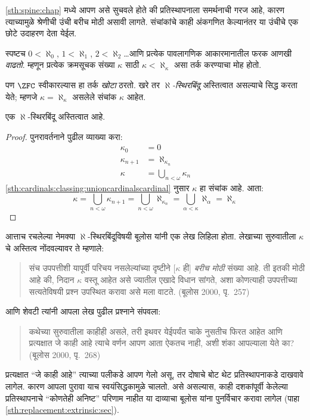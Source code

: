 \ref{sth:spine:chap} मध्ये आपण असे सुचवले होते की प्रतिस्थापनाला समर्थनाची गरज आहे, कारण त्याच्यामुळे श्रेणीची उंची बरीच मोठी असावी लागते. संचांकांचे काही अंकगणित केल्यानंतर या उंचीचे एक छोटे उदाहरण देता येईल.

स्पष्टच $0 < \aleph_0$, $1 < \aleph_1$, $2 < \aleph_2$\ldots आणि प्रत्येक पावलागणिक आकारमानातील फरक आणखी \emph{वाढतो}. म्हणून प्रत्येक क्रमसूचक संख्या $\kappa$ साठी $\kappa< \aleph_\kappa$ असा तर्क करण्याचा मोह होतो.

पण $\ZFC$ स्वीकारल्यास हा तर्क \emph{खोटा} ठरतो. खरे तर \emph{$\aleph$-स्थिरबिंदू} अस्तित्वात असल्याचे सिद्ध करता येते; म्हणजे $\kappa=\aleph_\kappa$ असलेले संचांक $\kappa$ आहेत.

\begin{prop}\label{sth:card-arithmetic:fix:alephfixed}
एक $\aleph$-स्थिरबिंदू अस्तित्वात आहे.
\end{prop}

\begin{proof}
पुनरावर्तनाने पुढील व्याख्या करा:
\begin{align*}
	\kappa_0 &= 0\\
	\kappa_{n+1} &= \aleph_{\kappa_n}\\
	\kappa&= \bigcup_{n < \omega}\kappa_n
\end{align*}
\ref{sth:cardinals:classing:unioncardinalscardinal} नुसार $\kappa$ हा संचांक आहे. आता:
\[
	\kappa= \bigcup_{n < \omega} \kappa_{n+1} =
	\bigcup_{n < \omega}\aleph_{\kappa_n} =
	\bigcup_{\alpha < \kappa}\aleph_\alpha = \aleph_\kappa
\]






\end{proof}

आत्ताच रचलेल्या नेमक्या $\aleph$-स्थिरबिंदूविषयी बूलोस यांनी एक लेख लिहिला होता. लेखाच्या सुरुवातीला $\kappa$ चे अस्तित्व नोंदवल्यावर ते म्हणाले:
\begin{quote}
	संच उपपत्तीशी यापूर्वी परिचय नसलेल्यांच्या दृष्टीने [$\kappa$ ही] \emph{बरीच मोठी} संख्या आहे. ती इतकी मोठी आहे की, निदान $\kappa$ वस्तू आहेत असे ज्यातील एखादे विधान सांगते, अशा कोणत्याही उपपत्तीच्या सत्यतेविषयी प्रश्न उपस्थित करावा असे मला वाटते.
	(बूलोस 2000, पृ.~257)
\end{quote}
आणि शेवटी त्यांनी आपला लेख पुढील प्रश्नाने संपवला:
\begin{quote}
	कथेच्या सुरुवातीला काहीही असले, तरी इथवर येईपर्यंत चाके नुसतीच फिरत आहेत आणि प्रत्यक्षात जे काही आहे त्याचे वर्णन आपण आता ऐकतच नाही, अशी शंका आपल्याला येते का?
	(बूलोस 2000, पृ.~268)
\end{quote}
प्रत्यक्षात “जे काही आहे” त्याच्या पलीकडे आपण गेलो असू, तर दोषाचे बोट थेट प्रतिस्थापनाकडे दाखवावे लागेल. कारण आपला पुरावा याच स्वयंसिद्धकामुळे चालतो. असे असल्यास, काही दशकांपूर्वी केलेल्या प्रतिस्थापनाचे “कोणतेही अनिष्ट” परिणाम नाहीत या दाव्याचा बूलोस यांना पुनर्विचार करावा लागेल (पाहा \ref{sth:replacement:extrinsic:sec}).

